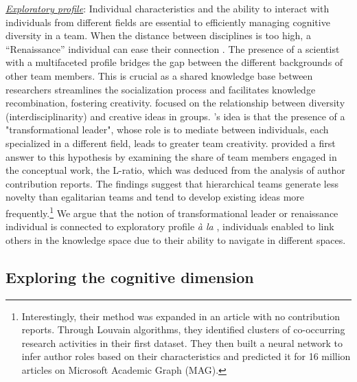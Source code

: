         
        \underline{\textit{Exploratory profile}}: Individual characteristics and the ability to interact with individuals from different fields are essential to efficiently managing cognitive diversity in a team. When the distance between disciplines is too high, a ``Renaissance'' individual \citep{jones2009burden} can ease their connection \citep{wu2022metrics}. The presence of a scientist with a multifaceted profile bridges the gap between the different backgrounds of other team members. This is crucial as a shared knowledge base between researchers streamlines the socialization process and facilitates knowledge recombination, fostering creativity. \cite{shin2007educational} focused on the relationship between diversity (interdisciplinarity) and creative ideas in groups. \cite{shin2007educational}'s idea is that the presence of a "transformational leader", whose role is to mediate between individuals, each specialized in a different field, leads to greater team creativity. \cite{xu2022flat} provided a first answer to this hypothesis by examining the share of team members engaged in the conceptual work, the L-ratio, which was deduced from the analysis of author contribution reports. The findings suggest that hierarchical teams generate less novelty than egalitarian teams and tend to develop existing ideas more frequently.\footnote{\justifying  Interestingly, their method was expanded in an article with no contribution reports. Through Louvain algorithms, they identified clusters of co-occurring research activities in their first dataset. They then built a neural network to infer author roles based on their characteristics and predicted it for 16 million articles on Microsoft Academic Graph (MAG).} We argue that the notion of transformational leader or renaissance individual is connected to exploratory profile \textit{à la} \cite{march1991exploration}, individuals enabled to link others in the knowledge space due to their ability to navigate in different spaces.



 \subsection{Exploring the cognitive dimension}

